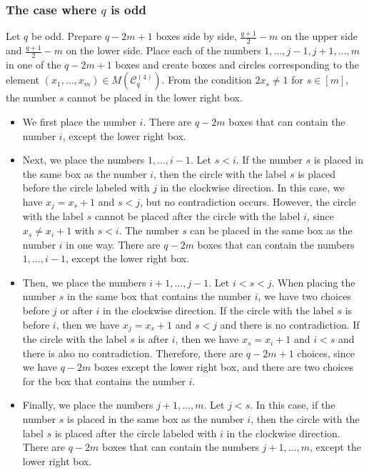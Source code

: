 \documentclass{article}
\theoremstyle{plain}
\theoremstyle{definition}
\theoremstyle{remark}
\numberwithin{equation}{section}
\newcommand{\Cc}{\mathcal{C}}
\begin{document}
\subsubsection{The case where $q$ is odd}\label{sec-TypeC-rest-x_i=x_j+1-odd}
Let $q$ be odd.
Prepare $q-2m+1$ boxes side by side, $\displaystyle \frac{q+1}{2}-m$ on the upper side and $\displaystyle \frac{q+1}{2}-m$ on the lower side.
Place each of the numbers $1,\dots,j-1,j+1,\dots,m$ in one of the $q-2m+1$ boxes and create boxes and circles corresponding to the element $(x_1,\dots,x_m)\in M(\Cc^{(4)}_q)$.
From the condition $2x_s\neq 1$ for $s\in[m]$, the number $s$ cannot be placed in the lower right box.
\begin{itemize}
\item We first place the number $i$.
There are $q-2m$ boxes that can contain the number $i$, except the lower right box.
\item Next, we place the numbers $1,\dots,i-1$. Let $s<i$.
If the number $s$ is placed in the same box as the number $i$, then the circle with the label $s$ is placed before the circle labeled with $j$ in the clockwise direction.
In this case, we have $x_j=x_s+1$ and $s<j$, but no contradiction occurs.
However, the circle with the label $s$ cannot be placed after the circle with the label $i$, since $x_s\neq x_i+1$ with $s<i$.
The number $s$ can be placed in the same box as the number $i$ in one way.
There are $q-2m$ boxes that can contain the numbers $1,\dots,i-1$, except the lower right box.
\item Then, we place the numbers $i+1,\dots,j-1$. Let $i<s<j$.
When placing the number $s$ in the same box that contains the number $i$, we have two choices before $j$ or after $i$ in the clockwise direction.
If the circle with the label $s$ is before $i$, then we have $x_j=x_s+1$ and $s<j$ and there is no contradiction.
If the circle with the label $s$ is after $i$, then we have $x_s=x_i+1$ and $i<s$ and there is also no contradiction.
Therefore, there are $q-2m+1$ choices, since we have $q-2m$ boxes except the lower right box, and there are two choices for the box that contains the number $i$.
\item Finally, we place the numbers $j+1,\dots,m$. Let $j<s$.
In this case, if the number $s$ is placed in the same box as the number $i$, then the circle with the label $s$ is placed after the circle labeled with $i$ in the clockwise direction.
There are $q-2m$ boxes that can contain the numbers $j+1,\dots,m$, except the lower right box.
\end{itemize}
\end{document}
